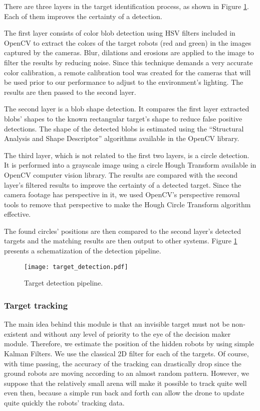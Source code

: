 There are three layers in the target identification process, as shown in Figure \ref{fig:gnc-detection}. Each of them improves the certainty of a detection. 

The first layer consists of color blob detection using HSV filters included in OpenCV to extract the colors of the target robots (red and green) in the images captured by the cameras. Blur, dilations and erosions are applied to the image to filter the results by reducing noise. Since this technique demands a very accurate color calibration, a remote calibration tool was created for the cameras that will be used prior to our performance to adjust to the environment’s lighting. The results are then passed to the second layer.

The second layer is a blob shape detection. It compares the first layer extracted blobs’ shapes to the known rectangular target’s shape to reduce false positive detections. The shape of the detected blobs is estimated using the “Structural Analysis and Shape Descriptor” \cite{journals/cvgip/SuzukiA85} algorithms available in the OpenCV library. 

The third layer, which is not related to the first two layers, is a circle detection. It is performed into a grayscale image using a circle Hough Transform \cite{yuen1990comparative} available in OpenCV computer vision library. The results are compared with the second layer’s filtered results to improve the certainty of a detected target. Since the camera footage has perspective in it, we used OpenCV’s perspective removal tools to remove that perspective to make the Hough Circle Transform algorithm effective. 

The found circles’ positions are then compared to the second layer’s detected targets and the matching results are then output to other systems.  Figure \ref{fig:gnc-detection} presents a schematization of the detection pipeline.

\begin{figure}[h!]
	\texttt{[image: target\_detection.pdf]}
	\vspace{-0.5cm}
	\caption{Target detection pipeline.}
	\label{fig:gnc-detection}
\end{figure}

\subsubsection*{Target tracking}

The main idea behind this module is that an invisible target must not be non-existent and without any level of priority to the eye of the decision maker module. Therefore, we estimate the position of the hidden robots by using simple Kalman Filters. We use the classical 2D filter for each of the targets. Of course, with time passing, the accuracy of the tracking can drastically drop since the ground robots are moving according to an almost random pattern. However, we suppose that the relatively small arena will make it possible to track quite well even then, because a simple run back and forth can allow the drone to update quite quickly the robots’ tracking data. 

